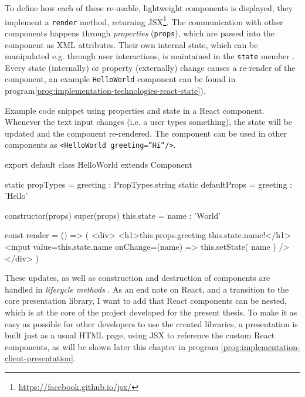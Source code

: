 To define how each of these re-usable, lightweight components is displayed, they implement a \texttt{render} method, returning JSX\footnote{\url{https://facebook.github.io/jsx/}}. The communication with other components happens through \emph{properties} (\texttt{props}), which are passed into the component as XML attributes. Their own internal state, which can be manipulated e.g. through user interactions, is maintained in the \texttt{state} member \cite{react-docu}. Every state (internally) or property (externally) change causes a re-render of the component, an example \texttt{HelloWorld} component can be found in program\ref{prog:implementation-technologies-react-state}).
%
\begin{program}
\caption{Example code snippet using properties and state in a React component. Whenever the text input changes (i.e. a user types something), the state will be updated and the component re-rendered. The component can be used in other components as \texttt{<HelloWorld greeting=''Hi''/>}.}
\label{prog:implementation-technologies-react-state}
\begin{JsCode}
export default class HelloWorld extends Component {
  static propTypes = { greeting : PropTypes.string }
  static defaultProps = { greeting : 'Hello' }

  constructor(props) {
    super(props)
    this.state = { name : 'World' }
  }

  const render = () => (
    <div>
      <h1>{this.props.greeting} {this.state.name}!</h1>
      <input value={this.state.name} onChange={(name) => this.setState({ name })} />
    </div>  
  )
}
\end{JsCode}
\end{program}
%
These updates, as well as construction and destruction of components are handled in \emph{lifecycle methods} \cite{react-docu}.
As an end note on React, and a transition to the core presentation library, I want to add that React components can be nested, which is at the core of the project developed for the present thesis. To make it as easy as possible for other developers to use the created libraries, a presentation is built just as a usual HTML page, using JSX to reference the custom React components, as will be shown later this chapter in program \ref{prog:implementation-client-presentation}.

